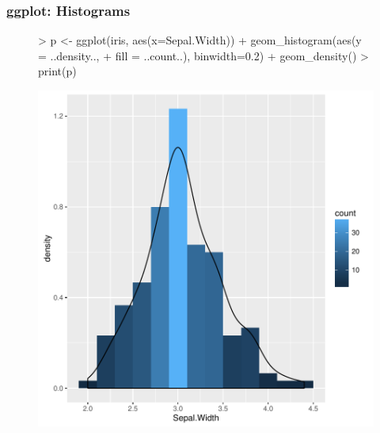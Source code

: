 \documentclass{beamer}
\begin{document}
\begin{frame}[containsverbatim]  
	\frametitle{ggplot: Histograms}
\scriptsize 
\begin{figure}
  \centering
\begin{Schunk}
\begin{Sinput}
> p <- ggplot(iris, aes(x=Sepal.Width)) + geom_histogram(aes(y = ..density.., 
+             fill = ..count..), binwidth=0.2) + geom_density()  
> print(p) 
\end{Sinput}
\end{Schunk}
\includegraphics{fig--071}
\label{fig:qplotscatter}
\end{figure}
\end{frame}
\end{document}
